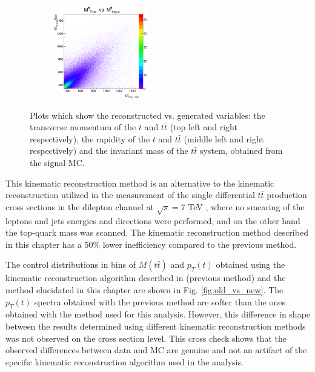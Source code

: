 \begin{figure}[t]
\begin{subfigure}
\end{subfigure}
\begin{subfigure}
  \centering
  \includegraphics[width=0.45\textwidth]{05_kinReco/plots/scatter/mtt-scaterPlot.png}
\end{subfigure}
\caption{Plots which show the reconstructed vs. generated variables: the transverse momentum of the $t$ and $t\bar{t}$ (top left and right respectively), 
        the rapidity of the $t$ and $t\bar{t}$ (middle left and right respectively) and the invariant mass of the $t\bar{t}$ system, obtained from the 
        signal MC.}
\label{fig:ScatterPl}
\end{figure}

This kinematic reconstruction method is an alternative to the kinematic reconstruction utilized in the measurement of the single differential $t\bar{t}$
production cross sections in the dilepton channel at $\sqrt{s} = $7 TeV \cite{Chatrchyan:2012saa}, where no smearing of the leptons and 
jets energies and directions were performed, and on the other hand the top-quark mass was scanned. The kinematic reconstruction method described
in this chapter has a 50\% lower inefficiency compared to the previous method.

The control distributions in bins of $M(t\bar{t})$ and $p_{T}(t)$ obtained using the kinematic reconstruction algorithm described in \cite{Chatrchyan:2012saa} (previous method)
and the method elucidated in this chapter are shown in Fig. \ref{fig:old_vs_new}. The $p_{T}(t)$ spectra obtained with the previous method are softer than the ones obtained with
the method used for this analysis. However, this difference in shape between the results determined using different kinematic reconstruction methods was not observed on 
the cross section level. This cross check shows that the observed differences between data and MC are genuine and not an artifact of the specific kinematic reconstruction 
algorithm used in the analysis.

